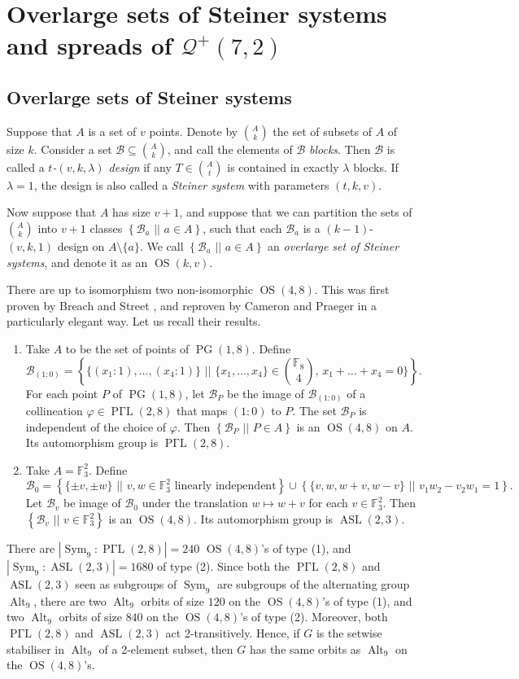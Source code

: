 \documentclass[a4paper]{article}
\theoremstyle{definition}
\renewcommand{\phi}{\varphi}
\newcommand{\FF}{\mathbb F}
\newcommand{\sett}[2]{ \left\{ #1 \, \, || \, \, #2 \right \} }
\newcommand{\mb}{\mathcal B}
\newcommand{\mq}{\mathcal Q}
\DeclareMathOperator{\PG}{PG}
\newcommand{\pg}{\PG}
\DeclareMathOperator{\PGamL}{P\Gamma L}
\DeclareMathOperator{\Sym}{Sym}
\DeclareMathOperator{\OS}{OS}
\DeclareMathOperator{\Alt}{Alt}
\DeclareMathOperator{\ASL}{ASL}
\begin{document}
\section{Overlarge sets of Steiner systems and spreads \texorpdfstring{of $\mq^+(7,2)$}{}}

\subsection{Overlarge sets of Steiner systems}

Suppose that $A$ is a set of $v$ points.
Denote by $\binom A k$ the set of subsets of $A$ of size $k$.
Consider a set $\mb \subseteq \binom Ak$, and call the elements of $\mb$ \emph{blocks}.
Then $\mb$ is called a \emph{$t$-$(v,k,\lambda)$ design} if any $T \in \binom At$ is contained in exactly $\lambda$ blocks.
If $\lambda=1$, the design is also called a \emph{Steiner system} with parameters $(t,k,v)$.

Now suppose that $A$ has size $v+1$, and suppose that we can partition the sets of $\binom A k$ into $v+1$ classes $\sett{\mb_a}{a \in A}$, such that each $\mb_a$ is a $(k-1)$-$(v,k,1)$ design on $A \setminus \{a\}$.
We call $\sett{\mb_a}{a \in A}$ an \emph{overlarge set of Steiner systems}, and denote it as an $\OS(k,v)$.

There are up to isomorphism two non-isomorphic $\OS(4,8)$.
This was first proven by Breach and Street \cite{Breach:Street}, and reproven by
Cameron and Praeger \cite{Cameron:Praeger} in a particularly elegant way.
Let us recall their results.
\begin{enumerate}
 \item Take $A$ to be the set of points of $\PG(1,8)$.
 Define
 \[
  \mb_{(1:0)} = \sett{ \{(x_1:1), \dots, (x_4:1) \} }{\{x_1,\dots,x_4\} \in \binom {\FF_8} 4, \, x_1 + \ldots + x_4 = 0 \}}.
 \]
 For each point $P$ of $\pg(1,8)$, let $\mb_P$ be the image of $\mb_{(1:0)}$ of a collineation $\phi \in \PGamL(2,8)$ that maps $(1:0)$ to $P$.
 The set $\mb_P$ is independent of the choice of $\phi$.
 Then $\sett{\mb_P}{P \in A}$ is an $\OS(4,8)$ on $A$.
 Its automorphism group is $\PGamL(2,8)$.

 \item Take $A = \FF_3^2$. Define
 \[
  \mb_0 = \sett{\{\pm v, \pm w\}}{v,w \in \FF_3^2 \text{ linearly independent}} \cup \sett{\{v,w,w+v,w-v\}}{v_1 w_2 - v_2 w_1 = 1}.
 \]
 Let $\mb_v$ be image of $\mb_0$ under the translation $w \mapsto w + v$ for each $v \in \FF_3^2$.
 Then $\sett{\mb_v}{v \in \FF_3^2}$ is an $\OS(4,8)$.
 Its automorphism group is $\ASL(2,3)$.
\end{enumerate}
There are $| \Sym_9 : \PGamL(2,8) | = 240$ $\OS(4,8)$'s of type (1), and $|\Sym_9 : \ASL(2,3) | = 1680$ of type (2).
Since both the $\PGamL(2,8)$ and $\ASL(2,3)$ seen as subgroups of $\Sym_9$ are subgroups of the alternating group $\Alt_9$, there are two $\Alt_9$ orbits of size $120$ on the $\OS(4,8)$'s of type (1), and two $\Alt_9$ orbits of size $840$ on the $\OS(4,8)$'s of type (2).
Moreover, both $\PGamL(2,8)$ and $\ASL(2,3)$ act 2-transitively.
Hence, if $G$ is the setwise stabiliser in $\Alt_9$ of a 2-element subset, then $G$ has the same orbits as $\Alt_9$ on the $\OS(4,8)$'s.
\end{document}
